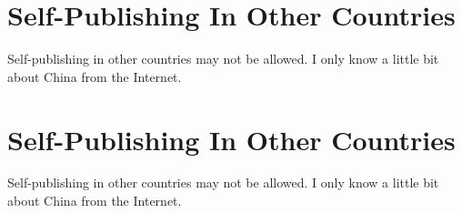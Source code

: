 \section{Self-Publishing In Other Countries}

Self-publishing in other countries may not be allowed. 
I only know a little bit about China from the Internet.



\section{Self-Publishing In Other Countries}

Self-publishing in other countries may not be allowed. 
I only know a little bit about China from the Internet.

